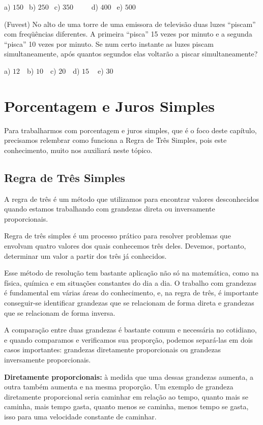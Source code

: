 \begin{multicols*}{2}
		      a) $150 \ \ $ b) $250 \ \ $ c) $350 \ \ \ \ \ \ \ \ \ \ $ d) $400 \ \ $ e) $500 \ \ $

		\execnum (Fuvest) No alto de uma torre de uma emissora de televisão duas luzes “piscam” com freqüências diferentes. A primeira “pisca” 15 vezes por minuto e a segunda “pisca” 10 vezes por minuto. Se num certo instante as luzes piscam simultaneamente, após quantos segundos elas voltarão a piscar simultaneamente?

		      a) $12 \ \ \ $ b) $10 \ \ \ $ c) $20 \ \ \ $ d) $15 \ \ \ \ $ e) $30 \ \ $


	\section{Porcentagem e Juros Simples}

	Para trabalharmos com porcentagem e juros simples, que é o foco deste capítulo, precisamos relembrar como funciona a Regra de Três Simples, pois este conhecimento, muito nos auxiliará neste tópico.

	\subsection{Regra de Três Simples}

	A regra de três é um método que utilizamos para encontrar valores desconhecidos quando estamos trabalhando com grandezas direta ou inversamente proporcionais.

	Regra de três simples é um processo prático para resolver problemas que envolvam quatro valores dos quais conhecemos três deles. Devemos, portanto, determinar um valor a partir dos três já conhecidos.

	Esse método de resolução tem bastante aplicação não só na matemática, como na física, química e em situações constantes do dia a dia. O trabalho com grandezas é fundamental em várias áreas do conhecimento, e, na regra de três, é importante conseguir-se identificar grandezas que se relacionam de forma direta e grandezas que se relacionam de forma inversa.

	A comparação entre duas grandezas é bastante comum e necessária no cotidiano, e quando comparamos e verificamos sua proporção, podemos separá-las em dois casos importantes: grandezas diretamente proporcionais ou grandezas inversamente proporcionais.

	\textbf{Diretamente proporcionais:} à medida que uma dessas grandezas aumenta, a outra também aumenta e na mesma proporção. Um exemplo de grandeza diretamente proporcional seria caminhar em relação ao tempo, quanto mais se caminha, mais tempo gasta, quanto menos se caminha, menos tempo se gasta, isso para uma velocidade constante de caminhar.


\end{multicols*}
